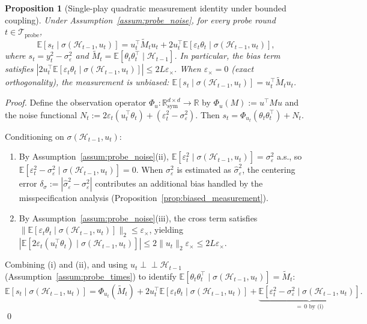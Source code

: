 \documentclass[12pt]{article}
\newcommand{\R}{\mathbb{R}}
\newcommand{\E}{\mathbb{E}}
\newcommand{\cH}{\mathcal{H}}
\newcommand{\cTprobe}{\mathcal{T}_{\mathrm{probe}}}
\newcommand{\Rsy}{\mathbb{R}^{d\times d}_{\mathrm{sym}}}
\newtheorem{proposition}{Proposition}
\theoremstyle{plain}
\theoremstyle{definition}
\begin{document}
\begin{proposition}[Single-play quadratic measurement identity under bounded coupling]
\label{prop:quadratic_identity}
Under Assumption~\ref{assum:probe_noise}, for every probe round $t \in \cTprobe$,
\begin{equation}
\E[s_t \mid \sigma(\cH_{t-1}, u_t)] = u_t^\top \widetilde{M}_t u_t + 2u_t^\top \E[\varepsilon_t \theta_t \mid \sigma(\cH_{t-1}, u_t)],
\label{eq:quadratic_id}
\end{equation}
where $s_t = y_t^2 - \sigma_\varepsilon^2$ and $\widetilde{M}_t = \E[\theta_t \theta_t^\top \mid \cH_{t-1}]$. In particular, the bias term satisfies $|2u_t^\top \E[\varepsilon_t \theta_t \mid \sigma(\cH_{t-1}, u_t)]| \le 2L\varepsilon_\times$. When $\varepsilon_\times = 0$ (exact orthogonality), the measurement is unbiased: $\E[s_t \mid \sigma(\cH_{t-1}, u_t)] = u_t^\top \widetilde{M}_t u_t$.
\end{proposition}

\begin{proof}
Define the observation operator $\Phi_u : \Rsy \to \R$ by $\Phi_u(M) := u^\top M u$ and the noise functional $N_t := 2\varepsilon_t (u_t^\top \theta_t) + (\varepsilon_t^2 - \sigma_\varepsilon^2)$. Then $s_t = \Phi_{u_t}(\theta_t \theta_t^\top) + N_t$.

Conditioning on $\sigma(\cH_{t-1}, u_t)$:
\begin{enumerate}[nosep,label=(\roman*)]
\item By Assumption~\ref{assum:probe_noise}(ii), $\E[\varepsilon_t^2 \mid \sigma(\cH_{t-1}, u_t)] = \sigma_\varepsilon^2$ a.s., so $\E[\varepsilon_t^2 - \sigma_\varepsilon^2 \mid \sigma(\cH_{t-1}, u_t)] = 0$. When $\sigma_\varepsilon^2$ is estimated as $\hat\sigma_\varepsilon^2$, the centering error $\delta_\sigma := |\hat\sigma_\varepsilon^2 - \sigma_\varepsilon^2|$ contributes an additional bias handled by the misspecification analysis (Proposition~\ref{prop:biased_measurement}).
\item By Assumption~\ref{assum:probe_noise}(iii), the cross term satisfies $\|\E[\varepsilon_t \theta_t \mid \sigma(\cH_{t-1}, u_t)]\|_2 \le \varepsilon_\times$, yielding $|\E[2\varepsilon_t(u_t^\top \theta_t) \mid \sigma(\cH_{t-1}, u_t)]| \le 2\|u_t\|_2\varepsilon_\times \le 2L\varepsilon_\times$.
\end{enumerate}
Combining (i) and (ii), and using $u_t \perp\!\!\!\perp \cH_{t-1}$ (Assumption~\ref{assum:probe_times}) to identify $\E[\theta_t\theta_t^\top \mid \sigma(\cH_{t-1}, u_t)] = \widetilde{M}_t$:
\[
\E[s_t \mid \sigma(\cH_{t-1}, u_t)]
= \Phi_{u_t}(\widetilde{M}_t) + 2u_t^\top \E[\varepsilon_t \theta_t \mid \sigma(\cH_{t-1}, u_t)] + \underbrace{\E[\varepsilon_t^2 - \sigma_\varepsilon^2 \mid \sigma(\cH_{t-1}, u_t)]}_{=\,0\text{ by (i)}}.
\]
\qed
\end{proof}
\end{document}
